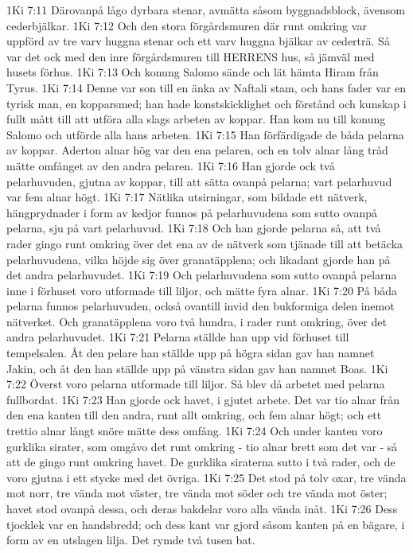 1Ki 7:11  Därovanpå lågo dyrbara stenar, avmätta såsom byggnadsblock, ävensom cederbjälkar.
1Ki 7:12  Och den stora förgårdsmuren där runt omkring var uppförd av tre varv huggna stenar och ett varv huggna bjälkar av cederträ. Så var det ock med den inre förgårdsmuren till HERRENS hus, så jämväl med husets förhus.
1Ki 7:13  Och konung Salomo sände och lät hämta Hiram från Tyrus.
1Ki 7:14  Denne var son till en änka av Naftali stam, och hans fader var en tyrisk man, en kopparsmed; han hade konstskicklighet och förstånd och kunskap i fullt mått till att utföra alla slags arbeten av koppar. Han kom nu till konung Salomo och utförde alla hans arbeten.
1Ki 7:15  Han förfärdigade de båda pelarna av koppar. Aderton alnar hög var den ena pelaren, och en tolv alnar lång tråd mätte omfånget av den andra pelaren.
1Ki 7:16  Han gjorde ock två pelarhuvuden, gjutna av koppar, till att sätta ovanpå pelarna; vart pelarhuvud var fem alnar högt.
1Ki 7:17  Nätlika utsirningar, som bildade ett nätverk, hängprydnader i form av kedjor funnos på pelarhuvudena som sutto ovanpå pelarna, sju på vart pelarhuvud.
1Ki 7:18  Och han gjorde pelarna så, att två rader gingo runt omkring över det ena av de nätverk som tjänade till att betäcka pelarhuvudena, vilka höjde sig över granatäpplena; och likadant gjorde han på det andra pelarhuvudet.
1Ki 7:19  Och pelarhuvudena som sutto ovanpå pelarna inne i förhuset voro utformade till liljor, och mätte fyra alnar.
1Ki 7:20  På båda pelarna funnos pelarhuvuden, också ovantill invid den bukformiga delen inemot nätverket. Och granatäpplena voro två hundra, i rader runt omkring, över det andra pelarhuvudet.
1Ki 7:21  Pelarna ställde han upp vid förhuset till tempelsalen. Åt den pelare han ställde upp på högra sidan gav han namnet Jakin, och åt den han ställde upp på vänstra sidan gav han namnet Boas.
1Ki 7:22  Överst voro pelarna utformade till liljor. Så blev då arbetet med pelarna fullbordat.
1Ki 7:23  Han gjorde ock havet, i gjutet arbete. Det var tio alnar från den ena kanten till den andra, runt allt omkring, och fem alnar högt; och ett trettio alnar långt snöre mätte dess omfång.
1Ki 7:24  Och under kanten voro gurklika sirater, som omgåvo det runt omkring - tio alnar brett som det var - så att de gingo runt omkring havet. De gurklika siraterna sutto i två rader, och de voro gjutna i ett stycke med det övriga.
1Ki 7:25  Det stod på tolv oxar, tre vända mot norr, tre vända mot väster, tre vända mot söder och tre vända mot öster; havet stod ovanpå dessa, och deras bakdelar voro alla vända inåt.
1Ki 7:26  Dess tjocklek var en handsbredd; och dess kant var gjord såsom kanten på en bägare, i form av en utslagen lilja. Det rymde två tusen bat.
